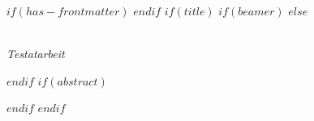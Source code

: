 $if(has-frontmatter)$
\frontmatter
$endif$
$if(title)$ %
$if(beamer)$ %
\frame{\titlepage}
$else$ %

\makeatletter
\begin{center}
  \vspace*{0.5cm}
  
  \textbf{\Huge \@title}\\
  \vspace{0.1cm}
  \textsf{\textit{\large Testatarbeit}}
  
  \vspace{0.5cm}

  \textsf{\large \@author \hspace{0.3cm}}

\end{center}
\makeatother

$endif$ %
$if(abstract)$
\begin{abstract}
$abstract$
\end{abstract}
$endif$
$endif$ %

